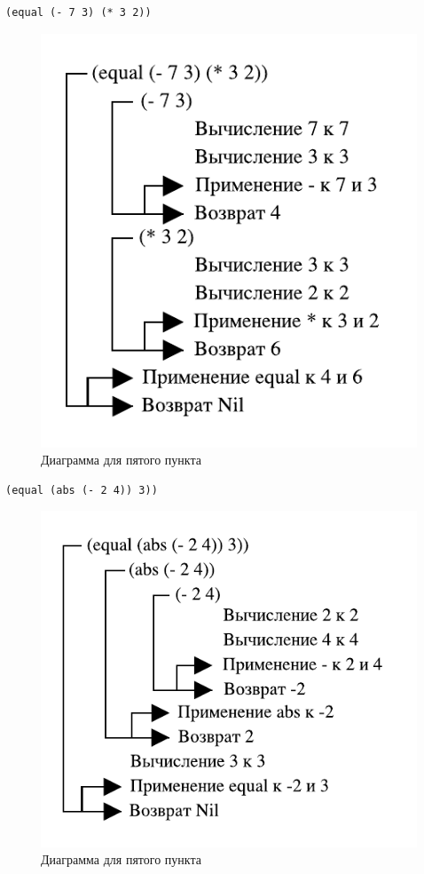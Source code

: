 \begin{lstlisting}
(equal (- 7 3) (* 3 2))
\end{lstlisting}

\begin{figure}[H]
    \centering
    \includegraphics{img/01_05.pdf}
    \caption{Диаграмма для пятого пункта}
\end{figure}

\begin{lstlisting}
(equal (abs (- 2 4)) 3))
\end{lstlisting}

\begin{figure}[H]
    \centering
    \includegraphics{img/01_06.pdf}
    \caption{Диаграмма для пятого пункта}
\end{figure}

